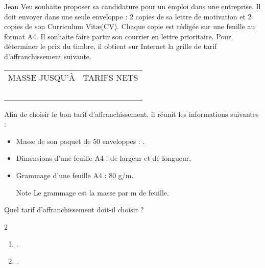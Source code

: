 \begin{exercice*}[Courrier]
    Jean Veu souhaite proposer sa candidature pour un emploi dans une entreprise.
    Il doit envoyer dans une seule enveloppe : $2$ copies de sa lettre de motivation
    et $2$ copies de son Curriculum Vit\ae (CV). Chaque copie est rédigée sur une feuille
    au format A4. Il souhaite faire partir son courrier en lettre prioritaire. Pour déterminer
    le prix du timbre, il obtient sur Internet la grille de tarif d'affranchissement suivante.

    \begin{tabularx}{0.48\textwidth}{|C|C|}
        \hline
        \tabularnewline        
        \hline
        MASSE JUSQU'À & TARIFS NETS \tabularnewline
        \hline
        & \tabularnewline
        \hline
        & \tabularnewline
        \hline
        & \tabularnewline
        \hline
        & \tabularnewline
        \hline
        & \tabularnewline
        \hline
    \end{tabularx}

    Afin de choisir le bon tarif d'affranchissement, il réunit les informations suivantes :
    \begin{itemize}
        \item Masse de son paquet de $50$ enveloppes : .
        \item Dimensions d'une feuille A4 :  de largeur et  de longueur.
        \item Grammage d'une feuille A4 : $80$ g/m.
    
        \begin{myBox}{Note}
            Le grammage est la masse par m de feuille.
        \end{myBox} 
    \end{itemize}

    Quel tarif d'affranchissement doit-il choisir ?
\end{exercice*}
\begin{corrige}
    \phantom{rrr}    
    \begin{multicols}2
        \begin{enumerate}
            \item .
            \item .
        \end{enumerate}
    \end{multicols}
\end{corrige}

